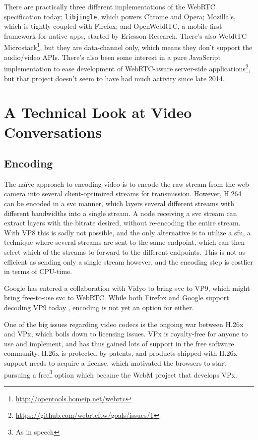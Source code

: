 There are practically three different implementations of the WebRTC specification today; \texttt{libjingle}, which powers Chrome and Opera; Mozilla's, which is tightly coupled with Firefox; and OpenWebRTC, a mobile-first framework for native apps, started by Ericsson Research. There's also WebRTC Microstack\footnote{\url{http://opentools.homeip.net/webrtc}}, but they are data-channel only, which means they don't support the audio/video APIs. There's also been some interest in a pure JavaScript implementation to ease development of WebRTC-aware server-side applications\footnote{\url{https://github.com/webrtcftw/goals/issues/1}}, but that project doesn't seem to have had much activity since late 2014.


\section{A Technical Look at Video Conversations}

\subsection{Encoding}

The naïve approach to encoding video is to encode the raw stream from the web camera into several client-optimized streams for transmission. However, H.264 can be encoded in a \gls{svc} manner, which layers several different streams with different bandwidths into a single stream. A node receiving a \gls{svc} stream can extract layers with the bitrate desired, without re-encoding the entire stream. With VP8 this is sadly not possible, and the only alternative is to utilize a \gls{sfu}, a technique where several streams are sent to the same endpoint, which can then select which of the streams to forward to the different endpoints. This is not as efficient as sending only a single stream however, and the encoding step is costlier in terms of CPU-time.

Google has entered a collaboration with Vidyo \cite{vp9-vidyo} to bring \gls{svc} to VP9, which might bring free-to-use \gls{svc} to WebRTC. While both Firefox and Google support decoding VP9 today \cite{vp9-support}, encoding is not yet an option for either.

One of the big issues regarding video codecs is the ongoing war between H.26x and VPx, which boils down to licensing issues. VPx is royalty-free for anyone to use and implement, and has thus gained lots of support in the free software community. H.26x is protected by patents, and products shipped with H.26x support needs to acquire a license, which motivated the browsers to start pursuing a free\footnote{As in speech} option which became the WebM project that develops VPx.


